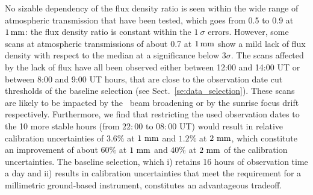 No sizable dependency of the flux density ratio is seen within the
wide range of atmospheric transmission that have been tested, which goes
from 0.5 to 0.9 at $1\,\rm{mm}$: the flux density ratio is constant
within the $1~\sigma$ errors. However, some scans at atmospheric
transmissions of about 0.7 at $1\,\rm{mm}$ show a mild lack
of flux density with respect to the median at a significance below
$3\sigma$. The scans affected by the lack of flux have all been observed 
either between 12:00 and 14:00 UT or between 8:00 and 9:00 UT hours,
that are close to the observation date cut thresholds of the baseline
selection (see Sect.~\ref{se:data_selection}). These scans are likely
to be impacted by the \afternoon\ beam broadening or by the
sunrise focus drift respectively. Furthermore, we find that restricting the
used observation dates to the 10 more stable hours (from $22:00$ to
$08:00$ UT) would result in relative calibration uncertainties of
$3.6\%$ at $1~\rm{mm}$ and $1.2\%$ at $2~\rm{mm}$, which constitute an
improvement of about $60\%$ at $1~\rm{mm}$ and $40\%$ at
$2~\rm{mm}$ of the calibration uncertainties.  
The baseline selection, which i) retains 16 hours of observation time
a day and ii) results in calibration uncertainties that meet the
requirement for a millimetric ground-based instrument, constitutes an
advantageous tradeoff.  

